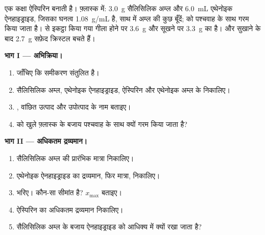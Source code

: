 \begin{problem}[{सप्ताहांत समस्या --- तीन ग्राम सैलिसिलिक अम्ल से शुद्ध ऐस्पिरिन के
एक जार तक: लब्धि क्या है?}]
\label{pb:g10:synthesis-yield:1}
एक कक्षा ऐस्पिरिन बनाती है। फ़्लास्क में: \qty{3.0}{g} सैलिसिलिक अम्ल और
\qty{6.0}{mL} एथेनोइक ऐनहाइड्राइड, जिसका घनत्व \qty{1.08}{g/mL} है, साथ में
अम्ल की कुछ बूँदें;  को पश्चवाह के साथ गरम किया जाता है। 
से इकट्ठा किया गया  गीला होने पर \qty{3.6}{g} और सूखने पर
\qty{3.3}{g} का है।  और सुखाने के बाद \qty{2.7}{g} सफ़ेद
क्रिस्टल बचते हैं।

\medskip
\noindent\textbf{भाग I --- अभिक्रिया।}
\begin{enumerate}
  \item जाँचिए कि समीकरण
         संतुलित है।
  \item सैलिसिलिक अम्ल, एथेनोइक ऐनहाइड्राइड, ऐस्पिरिन और एथेनोइक अम्ल के
         निकालिए।
  \item {}, वांछित उत्पाद और उपोत्पाद के नाम बताइए।
  \item {} को खुले फ़्लास्क के बजाय पश्चवाह के साथ क्यों गरम किया
        जाता है?
\end{enumerate}

\medskip
\noindent\textbf{भाग II --- अधिकतम द्रव्यमान।}
\begin{enumerate}[resume]
  \item सैलिसिलिक अम्ल की प्रारंभिक मात्रा निकालिए।
  \item एथेनोइक ऐनहाइड्राइड का द्रव्यमान, फिर मात्रा, निकालिए।
  \item {} भरिए। कौन-सा  सीमांत है?
        $x_{\max}$ बताइए।
  \item ऐस्पिरिन का अधिकतम द्रव्यमान निकालिए।
  \item सैलिसिलिक अम्ल के बजाय ऐनहाइड्राइड को आधिक्य में क्यों रखा
        जाता है?
\end{enumerate}


\end{problem}
